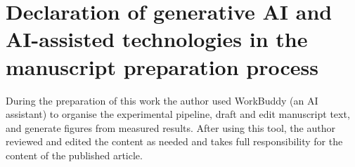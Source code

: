 \documentclass[preprint,12pt]{elsarticle}
\begin{document}
\section*{Declaration of generative AI and AI-assisted technologies in the manuscript preparation process}
During the preparation of this work the author used WorkBuddy (an AI assistant) to organise the experimental pipeline, draft and edit manuscript text, and generate figures from measured results. After using this tool, the author reviewed and edited the content as needed and takes full responsibility for the content of the published article.


\end{document}
